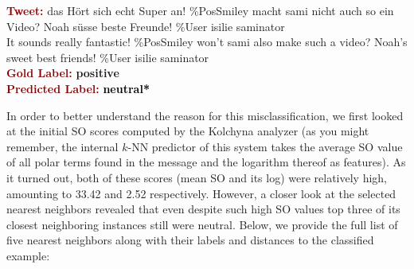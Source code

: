 \begin{example}\label{snt:cgsa:exmp:kolchyna-error-0}
  \noindent\textup{\bfseries\textcolor{darkred}{Tweet:}} {\upshape
    das H\"ort sich echt Super an! \%PosSmiley macht sami nicht auch so ein Video? Noah s\"usse beste Freunde! \heart \%User isilie saminator}\\
  \noindent It sounds really fantastic! \%PosSmiley won't sami also make such a video? Noah's sweet best friends! \heart \%User isilie saminator\\[0.65em]
  \noindent\textup{\bfseries\textcolor{darkred}{Gold Label:}}\hspace*{4.3em}\textbf{%
    \upshape\textcolor{green3}{positive}}\\
 \noindent\textup{\bfseries\textcolor{darkred}{Predicted Label:}}\hspace*{2em}\textbf{%
    \upshape\textcolor{black}{neutral*}}\\
\end{example}

\noindent In order to better understand the reason for this
misclassification, we first looked at the initial SO scores computed
by the Kolchyna analyzer (as you might remember, the internal $k$-NN
predictor of this system takes the average SO value of all polar terms
found in the message and the logarithm thereof as features).  As it
turned out, both of these scores (mean SO and its log) were relatively
high, amounting to 33.42 and 2.52 respectively.  However, a closer
look at the selected nearest neighbors revealed that even despite such
high SO values top three of its closest neighboring instances still
were neutral.  Below, we provide the full list of five nearest
neighbors along with their labels and distances to the classified
example:

